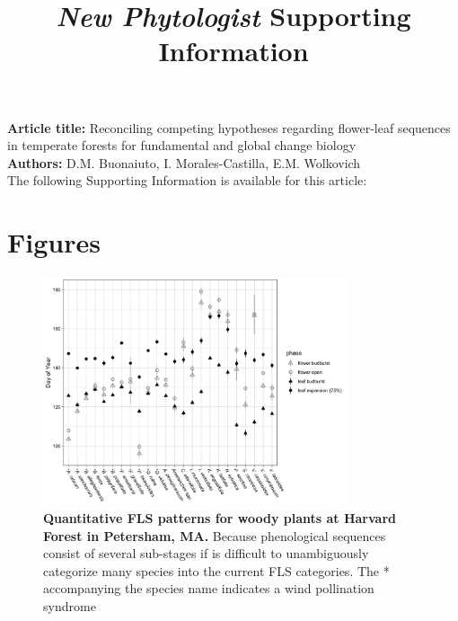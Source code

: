 \documentclass[11pt]{article}
\title{\textit{New Phytologist} Supporting Information}
\date{}
\begin{document}
\maketitle

\noindent \textbf{Article title:} Reconciling competing hypotheses regarding flower-leaf sequences in temperate forests for fundamental and global change biology\\
\noindent \textbf{Authors:} D.M. Buonaiuto, I. Morales-Castilla, E.M. Wolkovich\\

\noindent The following Supporting Information is available for this article:\\

\pagebreak[4]

\section*{Figures}
\begin{figure}[H]
    \centering
 \includegraphics[width=0.8\textwidth]{..//..//HarvardForest/HFmeans_expanded.jpeg} 
    \caption{\textbf{Quantitative FLS patterns for woody plants at Harvard Forest in Petersham, MA.} Because phenological sequences consist of several sub-stages if is difficult to unambiguously categorize many species into the current FLS categories. The * accompanying the species name indicates a wind pollination syndrome}
    \label{fig:HFmeans}
\end{figure}
\end{document}
